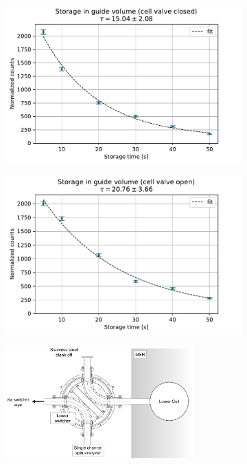 \begin{figure}
\centering
\begin{subfigure}{.5\textwidth} 
  \centering
  \includegraphics[width=\textwidth]{figures/store_valve_closed_fit.pdf}
  \caption{}\label{subfig:2022_guide_storage_cell_closed}
\end{subfigure}%
\begin{subfigure}{.5\textwidth}
  \centering
  \includegraphics[width=\textwidth]{figures/store_valve_open_fit.pdf}
  \caption{}\label{subfig:2022_guide_storage_cell_open}
\end{subfigure}
\begin{subfigure}{\textwidth}
    \vspace{\baselineskip}
  \centering
  \includegraphics[width=0.8\textwidth]{figures/guide_upstream_storage.pdf}

\end{subfigure}
\end{figure}
